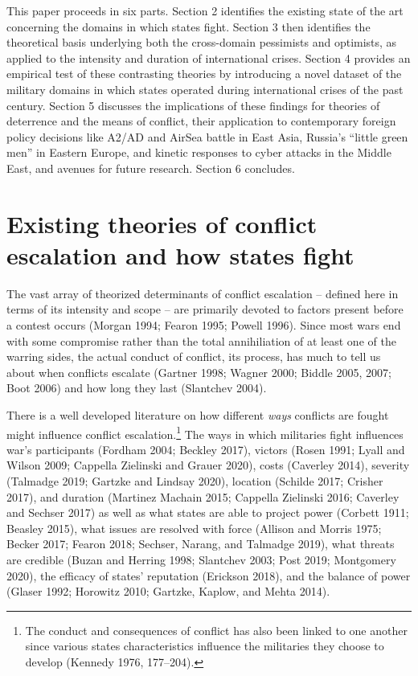 \documentclass[
]{article}
\begin{document}
This paper proceeds in six parts. Section 2 identifies the existing state of the art concerning the domains in which states fight. Section 3 then identifies the theoretical basis underlying both the cross-domain pessimists and optimists, as applied to the intensity and duration of international crises. Section 4 provides an empirical test of these contrasting theories by introducing a novel dataset of the military domains in which states operated during international crises of the past century. Section 5 discusses the implications of these findings for theories of deterrence and the means of conflict, their application to contemporary foreign policy decisions like A2/AD and AirSea battle in East Asia, Russia's ``little green men'' in Eastern Europe, and kinetic responses to cyber attacks in the Middle East, and avenues for future research. Section 6 concludes.

\hypertarget{existing-theories-of-conflict-escalation-and-how-states-fight}{%
\section{Existing theories of conflict escalation and how states fight}\label{existing-theories-of-conflict-escalation-and-how-states-fight}}

The vast array of theorized determinants of conflict escalation -- defined here in terms of its intensity and scope -- are primarily devoted to factors present before a contest occurs (Morgan 1994; Fearon 1995; Powell 1996). Since most wars end with some compromise rather than the total annihiliation of at least one of the warring sides, the actual conduct of conflict, its process, has much to tell us about when conflicts escalate (Gartner 1998; Wagner 2000; Biddle 2005, 2007; Boot 2006) and how long they last (Slantchev 2004).

There is a well developed literature on how different \textit{ways} conflicts are fought might influence conflict escalation.\footnote{The conduct and consequences of conflict has also been linked to one another since various states characteristics influence the militaries they choose to develop (Kennedy 1976, 177--204).} The ways in which militaries fight influences war's participants (Fordham 2004; Beckley 2017), victors (Rosen 1991; Lyall and Wilson 2009; Cappella Zielinski and Grauer 2020), costs (Caverley 2014), severity (Talmadge 2019; Gartzke and Lindsay 2020), location (Schilde 2017; Crisher 2017), and duration (Martinez Machain 2015; Cappella Zielinski 2016; Caverley and Sechser 2017) as well as what states are able to project power (Corbett 1911; Beasley 2015), what issues are resolved with force (Allison and Morris 1975; Becker 2017; Fearon 2018; Sechser, Narang, and Talmadge 2019), what threats are credible (Buzan and Herring 1998; Slantchev 2003; Post 2019; Montgomery 2020), the efficacy of states' reputation (Erickson 2018), and the balance of power (Glaser 1992; Horowitz 2010; Gartzke, Kaplow, and Mehta 2014).
\end{document}
